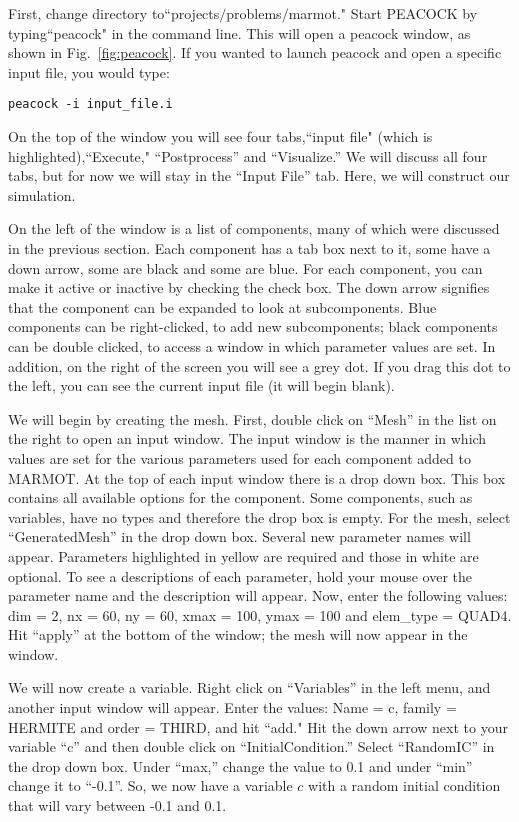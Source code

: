 \documentclass[letter,12pt,fleqn]{article}
\begin{document}
First, change directory to``projects$/$problems$/$marmot." Start PEACOCK by typing``peacock" in the command line. This will open a peacock window, as shown in Fig.~\ref{fig:peacock}. If you wanted to launch peacock and open a specific input file, you would type:
\begin{verbatim}
peacock -i input_file.i
\end{verbatim}
On the top of the window you will see four tabs,``input file" (which is highlighted),``Execute," ``Postprocess'' and ``Visualize.'' We will discuss all four tabs, but for now we will stay in the ``Input File'' tab. Here, we will construct our simulation.

On the left of the window is a list of components, many of which were discussed in the previous section. Each component has a tab box next to it, some have a down arrow, some are black and some are blue. For each component, you can make it active or inactive by checking the check box. The down arrow signifies that the component can be expanded to look at subcomponents. Blue components can be right-clicked, to add new subcomponents; black components can be double clicked, to access a window in which parameter values are set. In addition, on the right of the screen you will see a grey dot. If you drag this dot to the left, you can see the current input file (it will begin blank).

We will begin by creating the mesh. First, double click on ``Mesh'' in the list on the right to open an input window. The input window is the manner in which values are set for the various parameters used for each component added to MARMOT. At the top of each input window there is a drop down box. This box contains all available options for the component. Some components, such as variables, have no types and therefore the drop box is empty. For the mesh, select ``GeneratedMesh'' in the drop down box. Several new parameter names will appear. Parameters highlighted in yellow are required and those in white are optional. To see a descriptions of each parameter, hold your mouse over the parameter name and the description will appear. Now, enter the following values: dim = 2, nx = 60, ny = 60, xmax = 100, ymax = 100 and elem\_type = QUAD4. Hit ``apply'' at the bottom of the window; the mesh will now appear in the window.

We will now create a variable. Right click on ``Variables'' in the left menu, and another input window will appear. Enter the values: Name = c, family = HERMITE and order = THIRD, and hit ``add." Hit the down arrow next to your variable ``c'' and then double click on ``InitialCondition.'' Select ``RandomIC'' in the drop down box. Under ``max,'' change the value to 0.1 and under ``min'' change it to ``-0.1''. So, we now have a variable $c$ with a random initial condition that will vary between -0.1 and 0.1.
\end{document}
